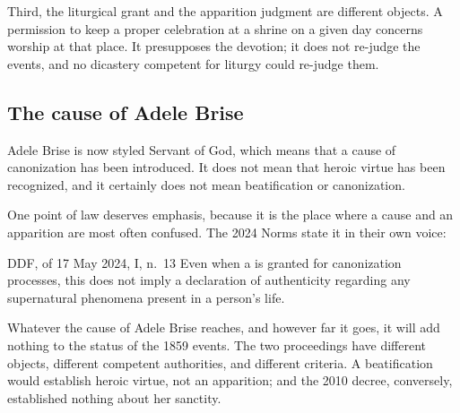 Third, the liturgical grant and the apparition judgment are different
objects. A permission to keep a proper celebration at a shrine on a
given day concerns worship at that place. It presupposes the devotion;
it does not re-judge the events, and no dicastery competent for
liturgy could re-judge them.

\subsection{The cause of Adele Brise}

Adele Brise is now styled Servant of God, which means that a cause of
canonization has been introduced. It does not mean that
heroic virtue has been recognized, and it certainly does not mean
beatification or canonization.

One point of law deserves emphasis, because it is the place where a
cause and an apparition are most often confused. The 2024 Norms state
it in their own voice:

\begin{witnesstext}{DDF,  of 17 May 2024, I, n.~13}
Even when a  is granted for canonization processes,
this does not imply a declaration of authenticity regarding any
supernatural phenomena present in a person's life.
\end{witnesstext}

Whatever the cause of Adele Brise reaches, and however far it goes, it
will add nothing to the status of the 1859 events. The two proceedings
have different objects, different competent authorities, and different
criteria. A beatification would establish heroic virtue, not an
apparition; and the 2010 decree, conversely, established nothing about
her sanctity.

